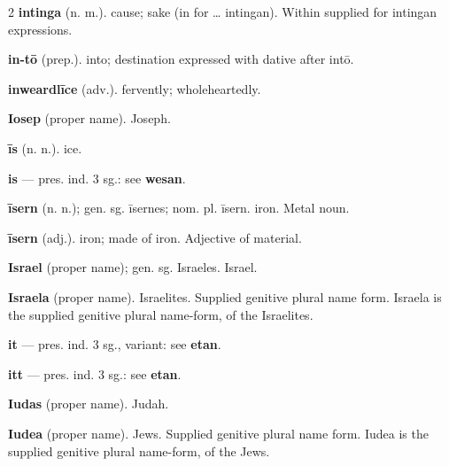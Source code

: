 \begin{multicols*}{2}
\textbf{intinga} (n. m.). cause; sake (in for … intingan). Within supplied for intingan expressions.\par
\textbf{in-tō} (prep.). into; destination expressed with dative after intō.\par
\textbf{inweardlīce} (adv.). fervently; wholeheartedly.\par
\textbf{Iosep} (proper name). Joseph.\par
\textbf{īs} (n. n.). ice.\par
\textbf{is} — pres. ind. 3 sg.: see \textbf{wesan}.\par
\textbf{īsern} (n. n.); gen. sg. īsernes; nom. pl. īsern. iron. Metal noun.\par
\textbf{īsern} (adj.). iron; made of iron. Adjective of material.\par
\textbf{Israel} (proper name); gen. sg. Israeles. Israel.\par
\textbf{Israela} (proper name). Israelites. Supplied genitive plural name form. Israela is the supplied genitive plural name-form, of the Israelites.\par
\textbf{it} — pres. ind. 3 sg., variant: see \textbf{etan}.\par
\textbf{itt} — pres. ind. 3 sg.: see \textbf{etan}.\par
\textbf{Iudas} (proper name). Judah.\par
\textbf{Iudea} (proper name). Jews. Supplied genitive plural name form. Iudea is the supplied genitive plural name-form, of the Jews.\par

\end{multicols*}
